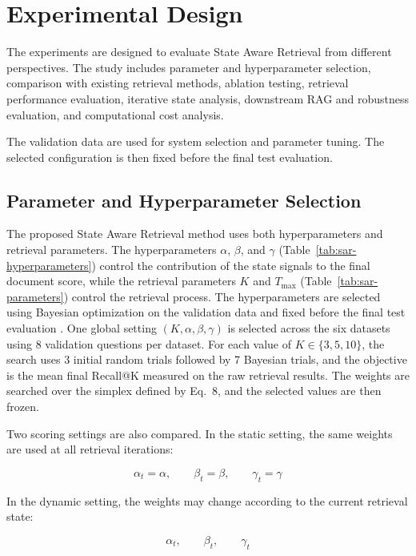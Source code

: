 \documentclass[12pt,a4paper]{report}
\begin{document}
\section{Experimental Design}

The experiments are designed to evaluate State Aware Retrieval from different perspectives. The study includes parameter and hyperparameter selection, comparison with existing retrieval methods, ablation testing, retrieval performance evaluation, iterative state analysis, downstream RAG and robustness evaluation, and computational cost analysis.

The validation data are used for system selection and parameter tuning. The selected configuration is then fixed before the final test evaluation.

\subsection{Parameter and Hyperparameter Selection}

The proposed State Aware Retrieval method uses both hyperparameters and retrieval parameters. The hyperparameters $\alpha$, $\beta$, and $\gamma$ (Table~\ref{tab:sar-hyperparameters}) control the contribution of the state signals to the final document score, while the retrieval parameters $K$ and $T_{\max}$ (Table~\ref{tab:sar-parameters}) control the retrieval process. The hyperparameters are selected using Bayesian optimization on the validation data and fixed before the final test evaluation \cite{snoek2012practical}. One global setting $(K,\alpha,\beta,\gamma)$ is selected across the six datasets using 8 validation questions per dataset. For each value of $K\in\{3,5,10\}$, the search uses 3 initial random trials followed by 7 Bayesian trials, and the objective is the mean final Recall@K measured on the raw retrieval results. The weights are searched over the simplex defined by Eq.~8, and the selected values are then frozen.

Two scoring settings are also compared. In the static setting, the same weights are used at all retrieval iterations:

\[
\alpha_t=\alpha,\qquad
\beta_t=\beta,\qquad
\gamma_t=\gamma
\]

In the dynamic setting, the weights may change according to the current retrieval state:

\[
\alpha_t,\qquad
\beta_t,\qquad
\gamma_t
\]
\end{document}
